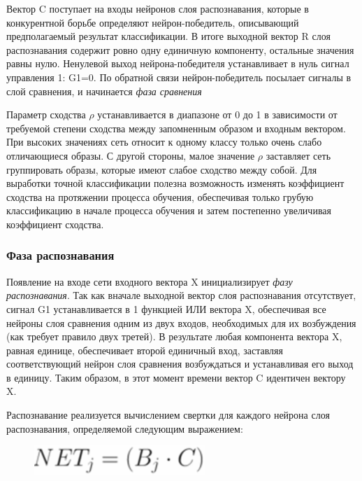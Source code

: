 \documentclass[14pt,a4paper,report]{article}
\begin{document}
Вектор C поступает на входы нейронов слоя распознавания, которые в конкурентной борьбе определяют нейрон-победитель, описывающий предполагаемый результат классификации. В итоге выходной вектор R слоя распознавания содержит ровно одну единичную компоненту, остальные значения равны нулю. Ненулевой выход нейрона-победителя устанавливает в нуль сигнал управления 1: G1=0. По обратной связи нейрон-победитель посылает сигналы в слой сравнения, и начинается \textit{фаза сравнения} \cite{cite-lek-narod}

Параметр сходства $\rho$ устанавливается в диапазоне от 0 до 1 в зависимости от требуемой степени сходства
между запомненным образом и входным вектором. При высоких значениях сеть относит к одному классу
только очень слабо отличающиеся образы. С другой стороны, малое значение $\rho$ заставляет сеть группировать образы, которые имеют слабое сходство между собой. Для выработки точной классификации полезна возможность изменять коэффициент сходства на протяжении процесса обучения, обеспечивая только грубую классификацию в начале процесса обучения и затем постепенно увеличивая коэффициент сходства. 

\subsubsection{Фаза распознавания}

Появление на входе сети входного вектора X инициализирует \textit{фазу распознавания}. Так как вначале выходной вектор слоя распознавания отсутствует, сигнал G1 устанавливается в 1 функцией ИЛИ вектора X, обеспечивая все нейроны слоя сравнения одним из двух входов, необходимых для их возбуждения (как требует правило двух третей). В результате любая компонента вектора X, равная единице, обеспечивает второй единичный вход, заставляя соответствующий нейрон слоя сравнения возбуждаться и устанавливая его выход в единицу. Таким образом, в этот момент времени вектор C идентичен вектору X. 

Распознавание реализуется вычислением свертки для каждого нейрона слоя распознавания, определяемой следующим выражением:

\begin{figure}[h!]
	\centering
	\includegraphics[scale = 0.55]{images/f_4.png}
\end{figure}
\end{document}
